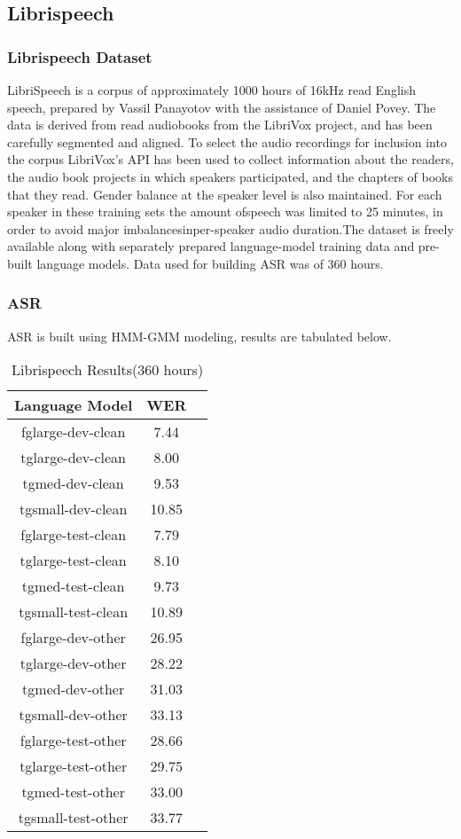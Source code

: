 \documentclass[12pt]{article}
\begin{document}
\subsection{Librispeech}
\subsubsection{Librispeech Dataset}
LibriSpeech is a corpus of approximately 1000 hours of 16kHz read English speech, prepared by Vassil Panayotov with the assistance of Daniel Povey. The data is derived from read audiobooks from the LibriVox project, and has been carefully segmented and aligned. To select the audio recordings for inclusion into the corpus LibriVox’s API has been used to collect information about the readers, the audio book projects in which
speakers participated, and the chapters of books that they read. Gender balance at
the speaker level is also maintained.
For each speaker in these training sets the amount ofspeech was limited to 25 minutes, in order to avoid major imbalancesinper-speaker audio duration.The dataset is freely available along with separately prepared language-model training data and pre-built language models.
Data used for building ASR was of 360 hours.

\subsubsection{ASR}
ASR is built using HMM-GMM modeling, results are tabulated below.
\newpage
\begin{table} [h!]
	\centering
		\caption{ Librispeech Results(360 hours) }
\label{tab:Pashto}
\begin{tabular}{ | c || c | c | }
\hline Language Model & WER\\ 
\hline
\hline fglarge-dev-clean & 7.44\\
\hline tglarge-dev-clean & 8.00\\
\hline tgmed-dev-clean & 9.53\\
\hline tgsmall-dev-clean & 10.85\\
\hline fglarge-test-clean & 7.79\\
\hline tglarge-test-clean & 8.10\\
\hline tgmed-test-clean & 9.73\\
\hline tgsmall-test-clean & 10.89\\
\hline fglarge-dev-other & 26.95\\
\hline tglarge-dev-other & 28.22\\
\hline tgmed-dev-other & 31.03\\
\hline tgsmall-dev-other & 33.13\\
\hline fglarge-test-other & 28.66\\
\hline tglarge-test-other & 29.75\\
\hline tgmed-test-other & 33.00\\
\hline tgsmall-test-other & 33.77\\
\hline

\end{tabular}
\end{table}
\end{document}
